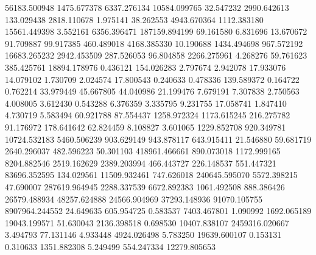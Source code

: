 56183.500948
1475.677378
6337.276134
10584.099765
32.547232
2990.642613
133.029438
2818.110678
1.975141
38.262553
4943.670364
1112.383180
15561.449398
3.552161
6356.396471
187159.894199
69.161580
6.831696
13.670672
91.709887
99.917385
460.489018
4168.385330
10.190688
1434.494698
967.572192
16683.265232
2942.453509
287.526053
96.804858
2266.275961
4.268276
59.761623
385.425761
18894.178976
0.436121
154.026283
2.797674
2.942078
17.933076
14.079102
1.730709
2.024574
17.800543
0.240633
0.478336
139.589372
0.164722
0.762214
33.979449
45.667805
44.040986
21.199476
7.679191
7.307838
2.750563
4.008005
3.612430
0.543288
6.376359
3.335795
9.231755
17.058741
1.847410
4.730719
5.583494
60.921788
87.554437
1258.972324
1173.615245
216.275782
91.176972
178.641642
62.824459
8.108827
3.601065
1229.852708
920.349781
10724.532183
5460.506239
903.629149
943.878117
643.915411
21.546880
59.681719
2640.296037
482.596223
50.301103
418961.466661
890.073018
1172.999165
8204.882546
2519.162629
2389.203994
466.443727
226.148537
551.447321
83696.352595
134.029561
11509.932461
747.626018
240645.595070
5572.398215
47.690007
287619.964945
2288.337539
6672.892383
1061.492508
888.386426
26579.488934
48257.624888
24566.904969
37293.148936
91070.105755
8907964.244552
24.649635
605.954725
0.583537
7403.467801
1.090992
1692.065189
19043.199571
51.630043
2136.398518
0.698530
10407.838107
2459316.020667
3.494793
77.131146
4.933448
4924.026498
5.783250
19639.600107
0.153131
0.310633
1351.882308
5.249499
554.247334
12279.805653

